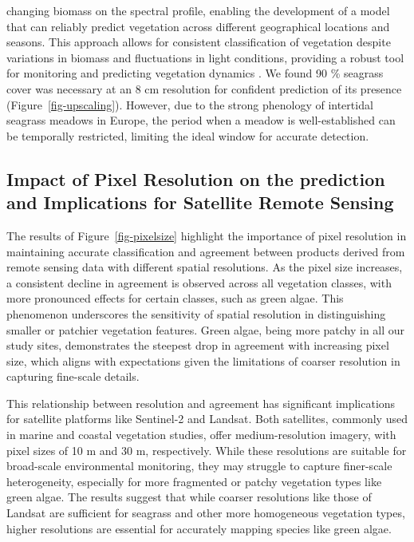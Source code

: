 \documentclass[
  number]{elsarticle}
\begin{document}
changing biomass on the spectral profile, enabling the development of a
model that can reliably predict vegetation across different geographical
locations and seasons. This approach allows for consistent
classification of vegetation despite variations in biomass and
fluctuations in light conditions, providing a robust tool for monitoring
and predicting vegetation dynamics \citetext{\citealp[
]{fyfe2003spatial}; \citealp[
]{COSTA2021107018}; \citealp{piaser2023impact}}. We found 90 \% seagrass
cover was necessary at an 8 cm resolution for confident prediction of
its presence (Figure~\ref{fig-upscaling}). However, due to the strong
phenology of intertidal seagrass meadows in Europe, the period when a
meadow is well-established can be temporally restricted, limiting the
ideal window for accurate detection.

\subsection{Impact of Pixel Resolution on the prediction and
Implications for Satellite Remote
Sensing}\label{impact-of-pixel-resolution-on-the-prediction-and-implications-for-satellite-remote-sensing}

The results of Figure~\ref{fig-pixelsize} highlight the importance of
pixel resolution in maintaining accurate classification and agreement
between products derived from remote sensing data with different spatial
resolutions. As the pixel size increases, a consistent decline in
agreement is observed across all vegetation classes, with more
pronounced effects for certain classes, such as green algae. This
phenomenon underscores the sensitivity of spatial resolution in
distinguishing smaller or patchier vegetation features. Green algae,
being more patchy in all our study sites, demonstrates the steepest drop
in agreement with increasing pixel size, which aligns with expectations
given the limitations of coarser resolution in capturing fine-scale
details.

This relationship between resolution and agreement has significant
implications for satellite platforms like Sentinel-2 and Landsat. Both
satellites, commonly used in marine and coastal vegetation studies,
offer medium-resolution imagery, with pixel sizes of 10 m and 30 m,
respectively. While these resolutions are suitable for broad-scale
environmental monitoring, they may struggle to capture finer-scale
heterogeneity, especially for more fragmented or patchy vegetation types
like green algae. The results suggest that while coarser resolutions
like those of Landsat are sufficient for seagrass and other more
homogeneous vegetation types, higher resolutions are essential for
accurately mapping species like green algae.
\end{document}
